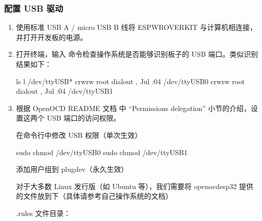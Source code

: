 \documentclass[a4paper,12pt,english]{sphinxmanual}
\begin{document}
\subsubsection{配置 USB 驱动}
\label{\detokenize{exp-esp32/ide/esp-idf-cli-debug:usb}}\begin{enumerate}
%
\item {} 
\sphinxAtStartPar
使用标准 USB A / micro USB B 线将 ESP\sphinxhyphen{}WROVER\sphinxhyphen{}KIT 与计算机相连接，并打开开发板的电源。

\item {} 
\sphinxAtStartPar
打开终端，输入  命令检查操作系统是否能够识别板子的 USB 端口。类似识别结果如下：

\begin{sphinxVerbatim}[commandchars=\\\{\}]
ls \PYGZhy{}l /dev/ttyUSB*
crw\PYGZhy{}rw\PYGZhy{}\PYGZhy{}\PYGZhy{}\PYGZhy{}  root dialout ,  Jul  :04 /dev/ttyUSB0
crw\PYGZhy{}rw\PYGZhy{}\PYGZhy{}\PYGZhy{}\PYGZhy{}  root dialout ,  Jul  :04 /dev/ttyUSB1
\end{sphinxVerbatim}

\item {} 
\sphinxAtStartPar
根据 OpenOCD README 文档 中 “Permissions delegation” 小节的介绍，设置这两个 USB 端口的访问权限。

\sphinxAtStartPar
在命令行中修改 USB 权限（单次生效）

\begin{sphinxVerbatim}[commandchars=\\\{\}]
sudo chmod  /dev/ttyUSB0
sudo chmod  /dev/ttyUSB1
\end{sphinxVerbatim}

\sphinxAtStartPar
添加用户组到 plugdev（永久生效）

\sphinxAtStartPar
对于大多数 Linux 发行版（如 Ubuntu 等），我们需要将 openocd\sphinxhyphen{}esp32 提供的文件放到下（具体请参考自己操作系统的文档）

\sphinxAtStartPar
.rules 文件目录：


\end{enumerate}
\end{document}
